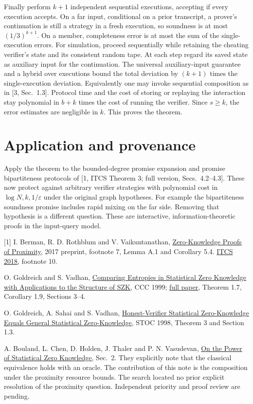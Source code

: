 \documentclass[11pt]{article}
\begin{document}
Finally perform $k+1$ independent sequential executions, accepting if every execution accepts. On a far input, conditional on a prior transcript, a prover's continuation is still a strategy in a fresh execution, so soundness is at most $(1/3)^{k+1}$. On a member, completeness error is at most the sum of the single-execution errors. For simulation, proceed sequentially while retaining the cheating verifier's state and its consistent random tape. At each step regard its saved state as auxiliary input for the continuation. The universal auxiliary-input guarantee and a hybrid over executions bound the total deviation by $(k+1)$ times the single-execution deviation. Equivalently one may invoke sequential composition as in [3, Sec.~1.3]. Protocol time and the cost of storing or replaying the interaction stay polynomial in $b+k$ times the cost of running the verifier. Since $s\ge k$, the error estimates are negligible in $k$. This proves the theorem.

\section{Application and provenance}
Apply the theorem to the bounded-degree promise expansion and promise bipartiteness protocols of [1, ITCS Theorem 3; full version, Secs.~4.2--4.3]. These now protect against arbitrary verifier strategies with polynomial cost in $\log N,k,1/\varepsilon$ under the original graph hypotheses. For example the bipartiteness soundness promise includes rapid mixing on the far side. Removing that hypothesis is a different question. These are interactive, information-theoretic proofs in the input-query model.

[1] I. Berman, R. D. Rothblum and V. Vaikuntanathan, \href{https://eprint.iacr.org/2017/114}{Zero-Knowledge Proofs of Proximity}, 2017 preprint, footnote 7, Lemma A.1 and Corollary 5.4. \href{https://doi.org/10.4230/LIPIcs.ITCS.2018.19}{ITCS 2018}, footnote 10.\par
[2] O. Goldreich and S. Vadhan, \href{https://doi.org/10.1109/CCC.1999.766262}{Comparing Entropies in Statistical Zero Knowledge with Applications to the Structure of SZK}, CCC 1999; \href{https://www.wisdom.weizmann.ac.il/~oded/PSX/gv2.pdf}{full paper}, Theorem 1.7, Corollary 1.9, Sections 3--4.\par
[3] O. Goldreich, A. Sahai and S. Vadhan, \href{https://people.seas.harvard.edu/~salil/research/dishonest-abs.html}{Honest-Verifier Statistical Zero-Knowledge Equals General Statistical Zero-Knowledge}, STOC 1998, Theorem 3 and Section 1.3.\par
[4] A. Bouland, L. Chen, D. Holden, J. Thaler and P. N. Vasudevan, \href{https://arxiv.org/abs/1609.02888}{On the Power of Statistical Zero Knowledge}, Sec.~2. They explicitly note that the classical equivalence holds with an oracle. The contribution of this note is the composition under the proximity resource bounds. The search located no prior explicit resolution of the proximity question. Independent priority and proof review are pending.
\end{document}
